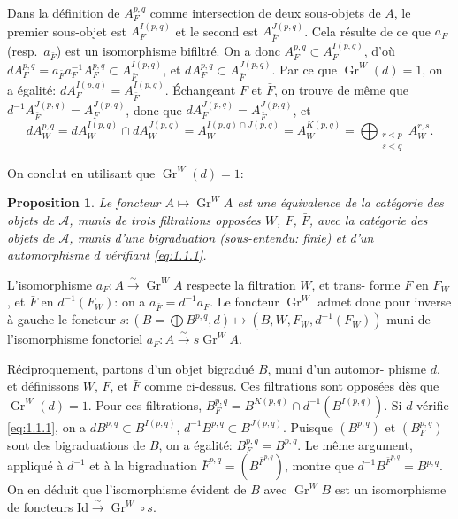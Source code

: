 \documentclass[12pt,a4paper]{article}
\theoremstyle{plain}
\newtheorem{proposition}[lemme]{Proposition}
\theoremstyle{definition}
\DeclareMathOperator{\Gr}{Gr}
\newcommand{\A}{\mathcal{A}}
\begin{document}
Dans la d\'{e}finition de $A_F^{p,q}$ comme intersection de deux sous-objets de $A$, le
premier sous-objet est $A_{F}^{I(p,q)}$ et le second est $A_{\bar{F}}^{J(p,q)}$. Cela r\'{e}sulte de ce que
$a_F$ (resp.~$a_{\bar{F}}$) est un isomorphisme bifiltr\'{e}. On a donc $A_F^{p,q} \subset A_F^{I(p,q)}$,
d'o\`{u}
$d A_F^{p,q} = a_{\bar{F}} a_F^{-1} A_F^{p,q} \subset A_{\bar{F}}^{I(p,q)}$, et $d A_F^{p,q} \subset A_{\bar{F}}^{J(p,q)}$. Par ce que $\Gr^W(d) = 1$, on
a \'{e}galit\'{e}: $d A_F^{I(p,q)} = A_{\bar{F}}^{I(p,q)}$. \'{E}changeant $F$ et $\bar{F}$, on trouve de m\^{e}me que
$d^{-1} A_{\bar{F}}^{J(p,q)} = A_F^{J(p,q)}$, donc que $d A_F^{J(p,q)} = A_{\bar{F}}^{J(p,q)}$, et
\begin{equation*}
d A_W^{p,q} = d A_W^{I(p,q)} \cap d A_W^{J(p,q)} = A_W^{I(p,q) \cap J(p,q)}
= A_W^{K(p,q)} = \bigoplus_{\substack{r < p \\ s < q}} A_W^{r,s}.
\end{equation*}

On conclut en utilisant que $\Gr^W(d) = 1$:

\begin{proposition}\label{prop:1.2}
Le foncteur $A \mapsto \Gr^W\!A$ est une \'{e}quivalence de la cat\'{e}gorie des objets de $\A$, munis de trois filtrations oppos\'{e}es $W$, $F$, $\bar{F}$, avec la
cat\'{e}gorie des objets de $\A$, munis d'une bigraduation (sous-entendu: finie) et
d'un automorphisme $d$ v\'{e}rifiant \eqref{eq:1.1.1}.
\end{proposition}

L'isomorphisme $a_F : A \xrightarrow{\sim} \Gr^W\!A$ respecte la filtration $W$, et trans-
forme $F$ en $F_W$, et $\bar{F}$ en $d^{-1}(F_W)$: on a $a_{\bar{F}} = d^{-1} a_F$. Le foncteur $\Gr^W$
admet donc pour inverse \`{a} gauche le foncteur $s : (B = \bigoplus B^{p,q}, d) \mapsto
(B, W, F_W, d^{-1}(F_W))$ muni de l'isomorphisme fonctoriel $a_F : A \xrightarrow{\sim} s\Gr^W\!A$.

R\'{e}ciproquement, partons d'un objet bigradu\'{e} $B$, muni d'un automor-
phisme $d$, et d\'{e}finissons $W$, $F$, et $\bar{F}$ comme ci-dessus. Ces filtrations
sont oppos\'{e}es d\`{e}s que $\Gr^W(d) = 1$. Pour ces filtrations, $B_F^{p,q} = B^{K(p,q)} \cap
d^{-1}(B^{I(p,q)})$. Si $d$ v\'{e}rifie \eqref{eq:1.1.1}, on a $d B^{p,q} \subset B^{I(p,q)}$, $d^{-1} B^{p,q} \subset B^{J(p,q)}$.
Puisque $(B^{p,q})$ et $(B_F^{p,q})$ sont des bigraduations de $B$, on a \'{e}galit\'{e}: $B_F^{p,q} =
B^{p,q}$. Le m\^{e}me argument, appliqu\'{e} \`{a} $d^{-1}$ et \`{a} la bigraduation $\bar{F}^{p,q} =
(B^{\bar{F}^{p,q}})$, montre que $d^{-1} B^{\bar{F}^{p,q}} = B^{p,q}$. On en d\'{e}duit que l'isomorphisme
\'{e}vident de $B$ avec $\Gr^W\!B$ est un isomorphisme de foncteurs $\mathrm{Id} \xrightarrow{\sim} \Gr^W \circ s$.
\end{document}
